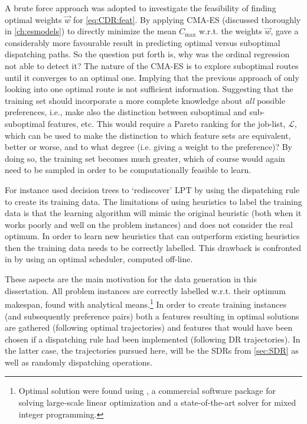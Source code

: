 A brute force approach was adopted to investigate the feasibility of finding 
optimal weights $\vec{w}$ for \cref{eq:CDR:feat}. 
By applying CMA-ES (discussed thoroughly in \cref{ch:esmodels}) to directly 
minimize the mean $C_{\max}$  w.r.t. the weights $\vec{w}$, gave a considerably 
more favourable result in predicting optimal versus suboptimal dispatching 
paths. 
So the question put forth is, why was the ordinal regression not able to detect 
it?
The nature of the CMA-ES is to explore suboptimal routes until it converges to 
an optimal one. 
Implying that the previous approach of only looking into one optimal route is 
not sufficient information. 
Suggesting that the training set should incorporate a more complete knowledge 
about \emph{all} possible preferences, i.e., make also the distinction between 
suboptimal and sub-suboptimal features, etc.  
This would require a Pareto ranking for the job-list, $\mathcal{L}$, which can 
be used to make the distinction to which feature sets are equivalent, better or 
worse, and to what degree (i.e. giving a weight to the preference)? 
By doing so, the training set becomes much greater, which of course would again 
need to be sampled in order to be computationally feasible to learn. 

For instance \cite{Siggi05} used decision trees to `rediscover' LPT by using 
the dispatching rule to create its training data. The limitations of using 
heuristics to label the training data is that the learning algorithm will mimic 
the original heuristic (both when it works poorly and well on the problem 
instances) and does not consider the real optimum. In order to learn new 
heuristics that can outperform existing heuristics then the training data needs 
to be correctly labelled. This drawback is confronted in 
\citep{Malik08,Russell09,Siggi10} by using an optimal scheduler, computed 
off-line. 

These aspects are the main motivation for the data generation in this 
dissertation. 
All problem instances are correctly labelled w.r.t. their optimum makespan, 
found with analytical means.\footnote{Optimal solution were found using 
    \cite{gurobi}, a commercial software package for solving large-scale linear 
    optimization and a state-of-the-art solver for mixed integer programming.} 
In order to create training instances (and subsequently preference pairs) both 
a features resulting in optimal solutions are gathered (following optimal 
trajectories) and features that would have been chosen if a dispatching rule 
had been implemented (following DR trajectories). 
In the latter case, the trajectories pursued here, will be the SDRs from 
\cref{sec:SDR} as well as randomly dispatching operations.


